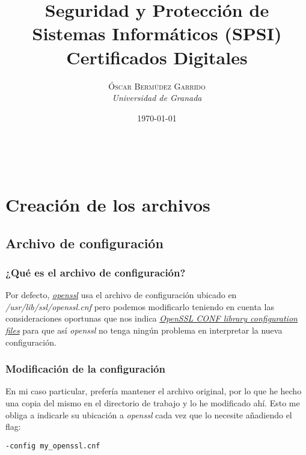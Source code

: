 \documentclass[a4paper, 11pt]{article}
\title{\textbf{Seguridad y Protección de Sistemas Informáticos (SPSI)}\\ %
Certificados Digitales} %
\author{\textsc{Óscar Bermúdez Garrido} %
\\{\textit{Universidad de Granada}}} %
\date{\today} %
\makeatletter
\renewcommand{\maketitle}{
  \begin{flushright} %
  
  {\LARGE\@title} %
  
  \vspace{50pt} %
  
  {\large\@author} %
  \\\@date %
  \vspace{40pt} %
  \end{flushright}
}
\makeatother
\begin{document}
\maketitle %

\renewcommand{\abstractname}{Resumen} %

{\parskip=2pt
  \tableofcontents
}
\pagebreak


\section{Creación de los archivos}
	\subsection{Archivo de configuración}
		\subsubsection{¿Qué es el archivo de configuración?}
			Por defecto, \href{http://manpages.ubuntu.com/manpages/zesty/en/man1/openssl.1ssl.html}{\textit{openssl}} usa el
			archivo de configuración ubicado en \textit{/usr/lib/ssl/openssl.cnf} pero podemos modificarlo teniendo en cuenta
			las consideraciones oportunas que nos indica \href{https://www.openssl.org/docs/man1.0.2/apps/config.html}
			{\textit{OpenSSL CONF library configuration files}} para que así \textit{openssl} no tenga ningún problema en
			interpretar la nueva configuración.
			
		\subsubsection{Modificación de la configuración}
			En mi caso particular, prefería mantener el archivo original, por lo que he hecho una copia del mismo en el
			directorio de trabajo y lo he modificado ahí. Esto me obliga a indicarle su ubicación a \textit{openssl} cada
			vez que lo necesite añadiendo el flag:\\
			\begin{small}
				\verb|-config my_openssl.cnf|\\
			\end{small}
		
\end{document}

